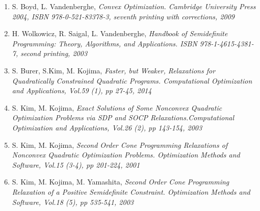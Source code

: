 \documentclass[12pt]{book}
\theoremstyle{definition}
\begin{document}
\begin{enumerate}
\renewcommand*\labelenumi{[\theenumi]}




%
\item S. Boyd, L. Vandenberghe, \it Convex Optimization. \rm Cambridge University Press 2004, ISBN 978-0-521-83378-3, seventh printing with corrections, 2009 
\label{BoydCvxOpt}
%



\item H. Wolkowicz, R. Saigal, L. Vandenberghe, \it Handbook of Semidefinite Programming: Theory, Algorithms, and Applications. \rm
ISBN 978-1-4615-4381-7, second printing, 2003
\label{HandbookSDP}
%



\item S. Burer, S.Kim, M. Kojima, \it Faster, but Weaker, Relaxations for Quadratically Constrained Quadratic Programs. \rm Computational Optimization and Applications, Vol.59 (1), pp 27-45, 2014
\label{BurerKimKojimaFasterWeakerRelax}
%
\item S. Kim, M. Kojima, \it Exact Solutions of Some Nonconvex Quadratic Optimization Problems via SDP and SOCP Relaxations.\rm  Computational Optimization and Applications, Vol.26 (2), pp 143-154, 2003
\label{KimKojimaExactSolViaSDPandSOCP}
%
\item S. Kim, M. Kojima, \it Second Order Cone Programming Relaxations of Nonconvex Quadratic Optimization Problems. \rm Optimization Methods and Software, Vol.15 (3-4), pp 201-224, 2001 
\label{KimKojimaSOCPofNoncvxQOP}
%
\item S. Kim, M. Kojima, M. Yamashita, \it Second Order Cone Programming Relaxation of a Positive Semidefinite Constraint. \rm  Optimization Methods and Software, Vol.18 (5), pp 535-541, 2003
\label{KimKojimaSOCPRelaxOfPSDconstr}


\end{enumerate}
\end{document}

